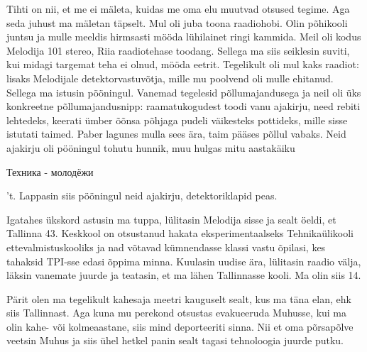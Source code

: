 

Tihti on nii, et me ei mäleta, kuidas me oma elu muutvad otsused  
tegime. Aga seda juhust ma mäletan täpselt. Mul oli juba toona 
raadiohobi. Olin põhikooli juntsu ja mulle meeldis hirmsasti mööda 
lühilainet ringi kammida. Meil oli kodus Melodija 101 stereo, Riia 
raadiotehase toodang. Sellega ma siis seiklesin suviti, kui midagi targemat 
teha ei olnud, mööda eetrit. Tegelikult oli mul kaks raadiot: lisaks Melodijale 
detektorvastuvõtja, mille mu poolvend 
oli mulle ehitanud. Sellega ma istusin pööningul. Vanemad tegelesid 
põllumajandusega ja neil oli 
üks konkreetne põllumajandusnipp: raamatukogudest toodi vanu ajakirju, 
need rebiti lehtedeks, keerati ümber õõnsa 
põhjaga pudeli väikesteks pottideks, mille sisse istutati taimed. 
Paber lagunes mulla sees ära, taim pääses põllul vabaks. Neid ajakirju oli 
pööningul tohutu hunnik, muu hulgas mitu aastakäiku 
\begin{russian}Техника - молодёжи\end{russian}'t. Lappasin siis 
pööningul neid ajakirju, detektoriklapid peas. 

Igatahes ükskord astusin ma tuppa, lülitasin Melodija sisse ja sealt öeldi, et 
Tallinna 43. Keskkool 
on otsustanud hakata 
eksperimentaalseks Tehnikaülikooli ettevalmistuskooliks ja 
nad võtavad kümnendasse klassi vastu õpilasi, kes tahaksid TPI-sse edasi õppima 
minna. Kuulasin uudise ära, lülitasin raadio välja, läksin vanemate juurde ja 
teatasin, et ma lähen Tallinnasse kooli. Ma olin siis 14.



Pärit olen ma tegelikult kahesaja meetri kauguselt sealt, kus ma täna elan, 
ehk siis Tallinnast. Aga kuna mu perekond otsustas evakueeruda 
Muhusse, kui ma olin kahe- või kolmeaastane, siis mind 
deporteeriti sinna. Nii et oma põrsapõlve veetsin Muhus ja siis ühel 
hetkel panin sealt tagasi tehnoloogia juurde putku. 

